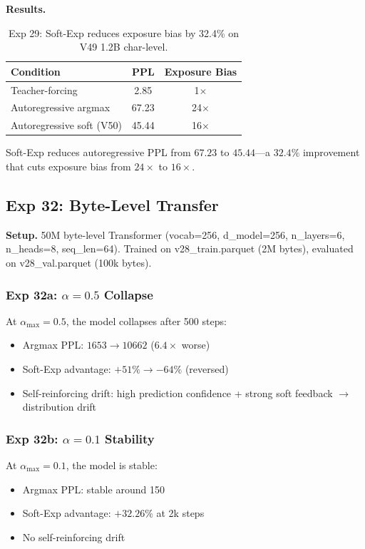 \documentclass[11pt]{article}
\begin{document}
\textbf{Results.}
\begin{table}[h]
\centering
\begin{tabular}{lcc}
\toprule
Condition & PPL & Exposure Bias \\
\midrule
Teacher-forcing & 2.85 & 1$\times$ \\
Autoregressive argmax & 67.23 & 24$\times$ \\
Autoregressive soft (V50) & 45.44 & 16$\times$ \\
\bottomrule
\end{tabular}
\caption{Exp 29: Soft-Exp reduces exposure bias by 32.4\% on V49 1.2B char-level.}
\label{tab:exp29}
\end{table}

Soft-Exp reduces autoregressive PPL from $67.23$ to $45.44$—a $32.4\%$ improvement that cuts exposure bias from $24\times$ to $16\times$.

\subsection{Exp 32: Byte-Level Transfer}
\label{sec:exp32}

\textbf{Setup.} 50M byte-level Transformer (vocab=256, d\_model=256, n\_layers=6, n\_heads=8, seq\_len=64). Trained on v28\_train.parquet (2M bytes), evaluated on v28\_val.parquet (100k bytes).

\subsubsection{Exp 32a: $\alpha=0.5$ Collapse}
\label{sec:exp32a}

At $\alpha_{\max} = 0.5$, the model collapses after 500 steps:
\begin{itemize}
    \item Argmax PPL: $1653 \to 10662$ ($6.4\times$ worse)
    \item Soft-Exp advantage: $+51\% \to -64\%$ (reversed)
    \item Self-reinforcing drift: high prediction confidence + strong soft feedback $\to$ distribution drift
\end{itemize}

\subsubsection{Exp 32b: $\alpha=0.1$ Stability}
\label{sec:exp32b}

At $\alpha_{\max} = 0.1$, the model is stable:
\begin{itemize}
    \item Argmax PPL: stable around 150
    \item Soft-Exp advantage: $+32.26\%$ at 2k steps
    \item No self-reinforcing drift
\end{itemize}
\end{document}
